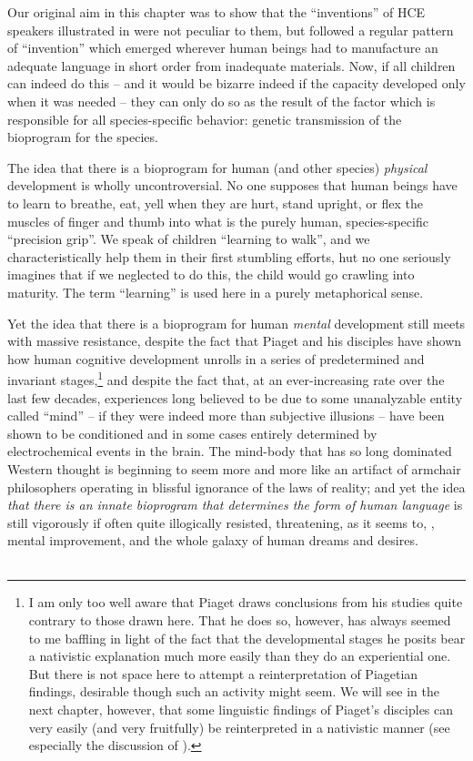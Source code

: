Our original aim in this chapter was to show that the ``inventions'' of HCE speakers illustrated in  were not peculiar to them, but followed a regular pattern of ``invention'' which emerged wherever human beings had to manufacture an adequate language in short order from inadequate materials. Now, if all children can indeed do this -- and it would be bizarre indeed if the capacity developed only when it was needed -- they can only do so as the result of the factor which is responsible for all species-specific behavior: genetic transmission of the bioprogram for the species.

The idea that there is a bioprogram for human (and other species) \textit{physical} development is wholly uncontroversial. No one supposes that human beings have to learn to breathe, eat, yell when they are hurt, stand upright, or flex the muscles of finger and thumb into what is the purely human, species-specific ``precision grip''. We speak of children ``learning to walk'', and we characteristically help them in their first stumbling efforts, hut no one seriously imagines that if we neglected to do this, the child would go crawling into maturity. The term ``learning'' is used here in a purely metaphorical sense.

Yet the idea that there is a bioprogram for human \textit{mental} development still meets with massive resistance, despite the fact that Piaget and his disciples have shown how human cognitive development unrolls in a series of predetermined and invariant stages,\footnote{I am only too well aware that Piaget draws conclusions from his studies quite contrary to those drawn here. That he does so, however, has always seemed to me baffling in light of the fact that the developmental stages he posits bear a nativistic explanation much more easily than they do an experiential one. But there is not space here to attempt a reinterpretation of Piagetian findings, desirable though such an activity might seem. We will see in the next chapter, however, that some linguistic findings of Piaget's disciples can very easily (and very fruitfully) be reinterpreted in a nativistic manner (see especially the discussion of \citealt{BrockartEtAl1973}).} and despite
the fact that, at an ever-increasing rate over the last few decades, experiences long believed to be due to some unanalyzable entity called ``mind'' -- if they were indeed more than subjective illusions -- have been shown to be conditioned and in some cases entirely determined by electrochemical events in the brain. The mind-body  that has so long dominated Western thought is beginning to seem more and more like an artifact of armchair philosophers operating in blissful ignorance of the laws of reality; and yet the idea \textit{that there is an innate bioprogram that determines the form of human language} is still vigorously if often quite illogically resisted, threatening, as it seems to, , mental improvement, and the whole galaxy of human dreams and desires.\\\\

